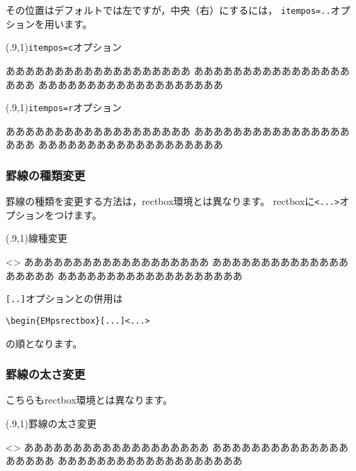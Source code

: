 \documentclass[a4j]{jarticle}
\begin{document}
その位置はデフォルトでは左ですが，中央（右）にするには，
\verb+itempos=..+オプションを用います。

\begin{showEx}(.9,1){\texttt{itempos=c}オプション}
\begin{EMpsrectbox}[item={~中央見出し~},itempos=c]
あああああああああああああああああああ
あああああああああああああああああああ
あああああああああああああああああああ
\end{EMpsrectbox}
\end{showEx}

\begin{showEx}(.9,1){\texttt{itempos=r}オプション}
\begin{EMpsrectbox}[item={~右見出し~},itempos=r]
あああああああああああああああああああ
あああああああああああああああああああ
あああああああああああああああああああ
\end{EMpsrectbox}
\end{showEx}

\subsubsection{罫線の種類変更}
罫線の種類を変更する方法は，\textsf{rectbox}環境とは異なります。
\textsf{rectbox}に\verb+<...>+オプションをつけます。

\begin{showEx}(.9,1){線種変更}
\begin{EMpsrectbox}<>
あああああああああああああああああああ
あああああああああああああああああああ
あああああああああああああああああああ
\end{EMpsrectbox}
\end{showEx}

\verb+[..]+オプションとの併用は
\begin{jquote}
\begin{verbatim}
\begin{EMpsrectbox}[...]<...>
\end{verbatim}
\end{jquote}
の順となります。

\subsubsection{罫線の太さ変更}

こちらも\textsf{rectbox}環境とは異なります。

\begin{showEx}(.9,1){罫線の太さ変更}
\begin{EMpsrectbox}<>%
あああああああああああああああああああ
あああああああああああああああああああ
あああああああああああああああああああ
\end{EMpsrectbox}
\end{showEx}
\end{document}

